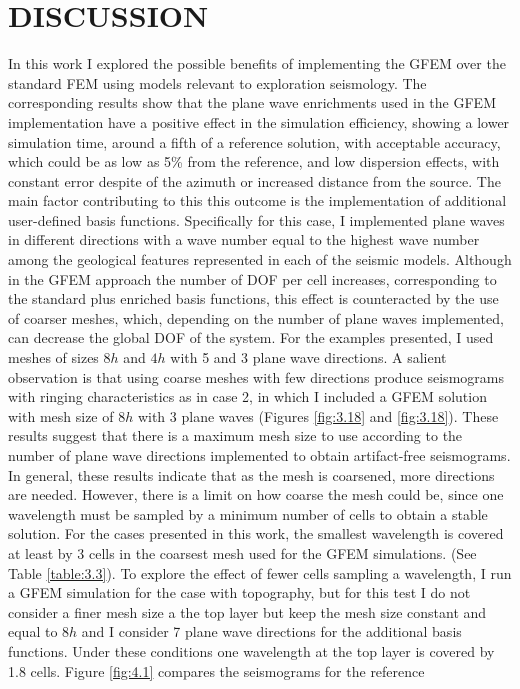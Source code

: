 %
%
%
%



\chapter{\uppercase {Discussion}}
In this work I explored the possible benefits of implementing the GFEM over the standard FEM using models relevant to exploration seismology. The corresponding results show that the plane wave enrichments used in the GFEM implementation have a positive effect in the simulation efficiency, showing a lower simulation time, around a fifth of a reference solution, with acceptable accuracy, which could be as low as 5\% from the reference, and low dispersion effects, with constant error despite of the azimuth or increased distance from the source. The main factor contributing to this  this outcome is the implementation of additional user-defined basis functions. Specifically for this case, I implemented plane waves in different directions with a wave number equal to the highest wave number among the geological features represented in each of the seismic models. Although in the GFEM approach the number of DOF per cell increases, corresponding to the standard plus enriched  basis functions, this effect is counteracted by the use of coarser meshes, which, depending on the number of plane waves implemented, can decrease the global DOF of the system. For the examples presented, I used meshes of sizes $8h$ and $4h$ with 5 and 3 plane wave directions. A salient observation is that using coarse meshes with few directions produce seismograms with ringing characteristics as in case 2, in which I included a GFEM solution with mesh size of $8h$ with 3 plane waves (Figures \ref{fig:3.18} and \ref{fig:3.18}). These results suggest that there is a maximum mesh size to use according to the number of plane wave directions implemented to obtain artifact-free seismograms. In general, these results indicate that as the mesh is coarsened, more directions are needed. However, there is a limit on how coarse the mesh could be, since one wavelength must be sampled by  a minimum number of cells to obtain a stable solution. For the cases presented in this work, the smallest wavelength is covered at least by 3 cells in  the coarsest mesh used for the GFEM simulations. (See Table \ref{table:3.3}).  To explore the effect of fewer cells sampling a wavelength, I run a GFEM simulation for the case with topography, but for this test I do not consider a finer  mesh size a the top layer but keep the mesh size constant and equal to $8h$ and I consider 7 plane wave directions for the additional basis functions. Under these conditions one wavelength at the top layer is covered by 1.8 cells. Figure \ref{fig:4.1} compares the seismograms for the reference 